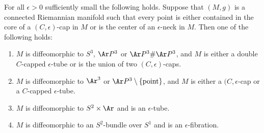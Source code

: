 \begin{proposition}
\label{prop:classification-covered-by-necks-caps}
\label{epstopology}
For all $\epsilon>0$ sufficiently small the following holds. Suppose
that $(M,g)$ is a connected Riemannian manifold such that every
point is either contained in the core of a $(C,\epsilon)$-cap in $M$
or is the center of an $\epsilon$-neck in $M$. Then one of the
following holds:
\begin{enumerate}
\item[(1)] $M$ is diffeomorphic to $S^3$, $\Ar P^3$ or $\Ar P^3\#\Ar
P^3$,
and $M$ is either a double $C$-capped $\epsilon$-tube or is the
union of two $(C,\epsilon)$-caps.
\item[(2)] $M$ is diffeomorphic to  $\Ar^3$ or $\Ar P^3\setminus \{\mathrm{point}\}$,
and $M$ is either a $(C,\epsilon$-cap or a $C$-capped
$\epsilon$-tube.
\item[(3)] $M$ is diffeomorphic to $S^2\times \Ar$ and is an
$\epsilon$-tube.
\item[(4)] $M$ is diffeomorphic to an $S^2$-bundle over $S^1$ and is an $\epsilon$-fibration.
\end{enumerate}
\end{proposition}
